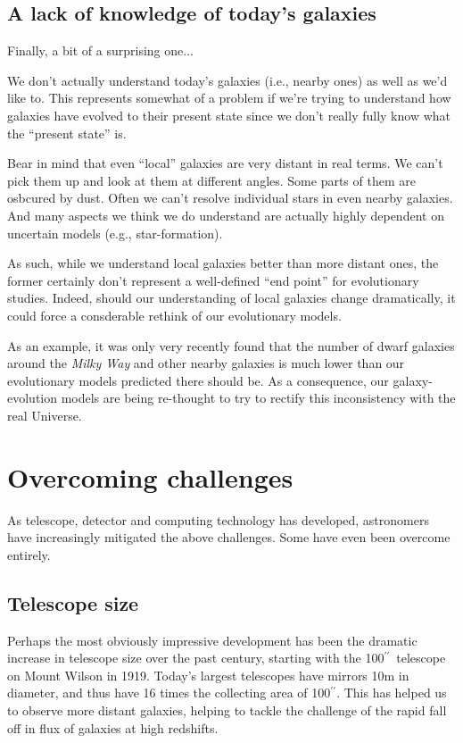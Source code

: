 \documentclass[11pt]{article}
\newcommand{\inchsign}{$^{\prime\prime}$}
\begin{document}
\subsection{A lack of knowledge of today's galaxies}
Finally, a bit of a surprising one...

We don't actually understand today's galaxies (i.e., nearby ones) as
well as we'd like to. This represents somewhat of a problem if we're
trying to understand how galaxies have evolved to their present state
since we don't really fully know what the ``present state'' is.

Bear in mind that even ``local'' galaxies are very distant in real
terms. We can't pick them up and look at them at different
angles. Some parts of them are osbcured by dust. Often we can't
resolve individual stars in even nearby galaxies. And many aspects we
think we do understand are actually highly dependent on uncertain
models (e.g., star-formation).

As such, while we understand local galaxies better than more distant
ones, the former certainly don't represent a well-defined ``end
point'' for evolutionary studies. Indeed, should our understanding of
local galaxies change dramatically, it could force a consderable
rethink of our evolutionary models.

As an example, it was only very recently found that the number of
dwarf galaxies around the {\it Milky Way} and other nearby galaxies is
much lower than our evolutionary models predicted there should be. As
a consequence, our galaxy-evolution models are being re-thought to try
to rectify this inconsistency with the real Universe.

\noindent

\section{Overcoming challenges}
As telescope, detector and computing technology has developed,
astronomers have increasingly mitigated the above challenges. Some
have even been overcome entirely.

\subsection{Telescope size}
Perhaps the most obviously impressive development has been the
dramatic increase in telescope size over the past century, starting
with the 100\inchsign\ telescope on Mount Wilson in 1919. Today's
largest telescopes have mirrors 10m in diameter, and thus have 16
times the collecting area of 100\inchsign. This has helped us to
observe more distant galaxies, helping to tackle the challenge of the
rapid fall off in flux of galaxies at high redshifts.
\end{document}
